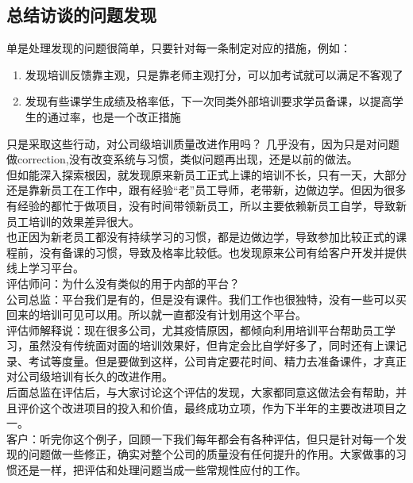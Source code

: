 \hypertarget{ux603bux7ed3ux8bbfux8c08ux7684ux95eeux9898ux53d1ux73b0}{%
\subsection{总结访谈的问题发现}\label{ux603bux7ed3ux8bbfux8c08ux7684ux95eeux9898ux53d1ux73b0}}

单是处理发现的问题很简单，只要针对每一条制定对应的措施，例如：

\begin{enumerate}
\tightlist
\item
  发现培训反馈靠主观，只是靠老师主观打分，可以加考试就可以满足不客观了
\item
  发现有些课学生成绩及格率低，下一次同类外部培训要求学员备课，以提高学生的通过率，也是一个改正措施
\end{enumerate}

只是采取这些行动，对公司级培训质量改进作用吗？
几乎没有，因为只是对问题做correction,没有改变系统与习惯，类似问题再出现，还是以前的做法。\\
但如能深入探索根因，就发现原来新员工正式上课的培训不长，只有一天，大部分还是靠新员工在工作中，跟有经验``老''员工导师，老带新，边做边学。但因为很多有经验的都忙于做项目，没有时间带领新员工，所以主要依赖新员工自学，导致新员工培训的效果差异很大。\\
也正因为新老员工都没有持续学习的习惯，都是边做边学，导致参加比较正式的课程前，没有备课的习惯，导致及格率比较低。也发现原来公司有给客户开发并提供线上学习平台。\\
评估师问：为什么没有类似的用于内部的平台？\\
公司总监：平台我们是有的，但是没有课件。我们工作也很独特，没有一些可以买回来的培训可见可以用。所以就一直都没有计划用这个平台。\\
评估师解释说：现在很多公司，尤其疫情原因，都倾向利用培训平台帮助员工学习，虽然没有传统面对面的培训效果好，但肯定会比自学好多了，同时还有上课记录、考试等度量。但是要做到这样，公司肯定要花时间、精力去准备课件，才真正对公司级培训有长久的改进作用。\\
后面总监在评估后，与大家讨论这个评估的发现，大家都同意这做法会有帮助，并且评价这个改进项目的投入和价值，最终成功立项，作为下半年的主要改进项目之一。\\
客户：听完你这个例子，回顾一下我们每年都会有各种评估，但只是针对每一个发现的问题做一些修正，确实对整个公司的质量没有任何提升的作用。大家做事的习惯还是一样，把评估和处理问题当成一些常规性应付的工作。


